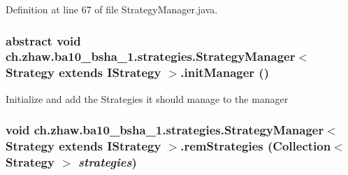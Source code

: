 Definition at line 67 of file StrategyManager.java.\hypertarget{classch_1_1zhaw_1_1ba10__bsha__1_1_1strategies_1_1StrategyManager_3_01Strategy_01extends_01IStrategy_01_4_a26c82f07fcb5ab3eac259d278e128145}{
\subsubsection[{initManager}]{\setlength{\rightskip}{0pt plus 5cm}abstract void ch.zhaw.ba10\_\-bsha\_\-1.strategies.StrategyManager$<$ Strategy extends {\bf IStrategy} $>$.initManager ()}}
\label{classch_1_1zhaw_1_1ba10__bsha__1_1_1strategies_1_1StrategyManager_3_01Strategy_01extends_01IStrategy_01_4_a26c82f07fcb5ab3eac259d278e128145}
Initialize and add the Strategies it should manage to the manager \hypertarget{classch_1_1zhaw_1_1ba10__bsha__1_1_1strategies_1_1StrategyManager_3_01Strategy_01extends_01IStrategy_01_4_a9806653412de5dd6db7e92eb86952302}{
\subsubsection[{remStrategies}]{\setlength{\rightskip}{0pt plus 5cm}void ch.zhaw.ba10\_\-bsha\_\-1.strategies.StrategyManager$<$ Strategy extends {\bf IStrategy} $>$.remStrategies (Collection$<$ Strategy $>$ {\em strategies})}}
\label{classch_1_1zhaw_1_1ba10__bsha__1_1_1strategies_1_1StrategyManager_3_01Strategy_01extends_01IStrategy_01_4_a9806653412de5dd6db7e92eb86952302}


